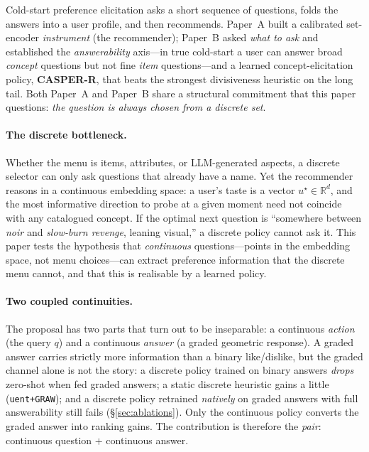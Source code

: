 \documentclass[11pt]{article}
\newcommand{\R}{\mathbb{R}}
\newcommand{\ustar}{u^{\star}}
\begin{document}
Cold-start preference elicitation asks a short sequence of questions, folds the answers into a user profile, and then
recommends. Paper~A built a calibrated set-encoder \emph{instrument} (the recommender); Paper~B asked \emph{what to ask}
and established the \emph{answerability} axis---in true cold-start a user can answer broad \emph{concept} questions but
not fine \emph{item} questions---and a learned concept-elicitation policy, \textbf{CASPER-R}, that beats the strongest
divisiveness heuristic on the long tail. Both Paper~A and Paper~B share a structural commitment that this paper
questions: \emph{the question is always chosen from a discrete set}.

\paragraph{The discrete bottleneck.} Whether the menu is items, attributes, or LLM-generated aspects, a discrete
selector can only ask questions that already have a name. Yet the recommender reasons in a continuous embedding space:
a user's taste is a vector $\ustar\in\R^{d}$, and the most informative direction to probe at a given moment need not
coincide with any catalogued concept. If the optimal next question is ``somewhere between \emph{noir} and
\emph{slow-burn revenge}, leaning visual,'' a discrete policy cannot ask it. This paper tests the hypothesis that
\emph{continuous} questions---points in the embedding space, not menu choices---can extract preference information that
the discrete menu cannot, and that this is realisable by a learned policy.

\paragraph{Two coupled continuities.} The proposal has two parts that turn out to be inseparable: a continuous
\emph{action} (the query $q$) and a continuous \emph{answer} (a graded geometric response). A graded answer carries
strictly more information than a binary like/dislike, but the graded channel alone is not the story: a discrete policy
trained on binary answers \emph{drops} zero-shot when fed graded answers; a static discrete heuristic gains a little
(\texttt{uent+GRAW}); and a discrete policy retrained \emph{natively} on graded answers with full answerability still
fails (\S\ref{sec:ablations}). Only the continuous policy converts the graded answer into ranking gains. The
contribution is therefore the \emph{pair}: continuous question $+$ continuous answer.
\end{document}
